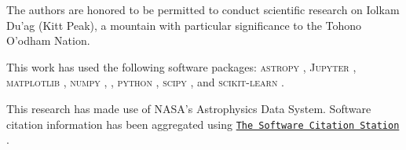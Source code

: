 The authors are honored to be permitted to conduct scientific research on Iolkam Du’ag (Kitt Peak), a mountain with particular significance to the Tohono O’odham Nation.

This work has used the following software packages: \textsc{astropy} \citep{astropy:2013, astropy:2018, astropy:2022}, \textsc{Jupyter} \citep{2007CSE.....9c..21P, kluyver2016jupyter}, \textsc{matplotlib} \citep{Hunter:2007}, \textsc{numpy} \citep{numpy}, \pycorr{} \citep{pycorr,corrfunc-1,corrfunc-2}, \textsc{python} \citep{python}, \textsc{scipy} \citep{2020SciPy-NMeth, scipy_8092679}, and \textsc{scikit-learn} \citep{scikit-learn, sklearn_api, scikit-learn_10034229}.

This research has made use of NASA's Astrophysics Data System.
Software citation information has been aggregated using \texttt{\href{https://www.tomwagg.com/software-citation-station/}{The Software Citation Station}} \citep{software-citation-station-paper, software-citation-station-zenodo}.